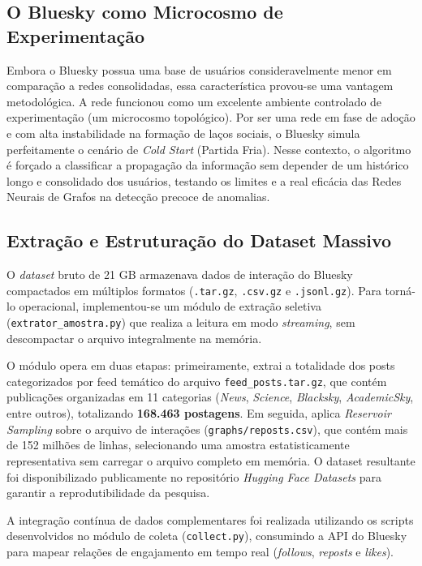\subsection{O Bluesky como Microcosmo de Experimentação}

Embora o Bluesky possua uma base de usuários consideravelmente menor em comparação a redes consolidadas, essa característica provou-se uma vantagem metodológica. A rede funcionou como um excelente ambiente controlado de experimentação (um microcosmo topológico). Por ser uma rede em fase de adoção e com alta instabilidade na formação de laços sociais, o Bluesky simula perfeitamente o cenário de \textit{Cold Start} (Partida Fria). Nesse contexto, o algoritmo é forçado a classificar a propagação da informação sem depender de um histórico longo e consolidado dos usuários, testando os limites e a real eficácia das Redes Neurais de Grafos na detecção precoce de anomalias.

\subsection{Extração e Estruturação do Dataset Massivo}

O \textit{dataset} bruto de 21 GB armazenava dados de interação do Bluesky compactados em múltiplos formatos (\texttt{.tar.gz}, \texttt{.csv.gz} e \texttt{.jsonl.gz}). Para torná-lo operacional, implementou-se um módulo de extração seletiva (\texttt{extrator\_amostra.py}) que realiza a leitura em modo \textit{streaming}, sem descompactar o arquivo integralmente na memória.

O módulo opera em duas etapas: primeiramente, extrai a totalidade dos posts categorizados por feed temático do arquivo \texttt{feed\_posts.tar.gz}, que contém publicações organizadas em 11 categorias (\textit{News}, \textit{Science}, \textit{Blacksky}, \textit{AcademicSky}, entre outros), totalizando \textbf{168.463 postagens}. Em seguida, aplica \textit{Reservoir Sampling} sobre o arquivo de interações (\texttt{graphs/reposts.csv}), que contém mais de 152 milhões de linhas, selecionando uma amostra estatisticamente representativa sem carregar o arquivo completo em memória. O dataset resultante foi disponibilizado publicamente no repositório \textit{Hugging Face Datasets} para garantir a reprodutibilidade da pesquisa.

A integração contínua de dados complementares foi realizada utilizando os scripts desenvolvidos no módulo de coleta (\texttt{collect.py}), consumindo a API do Bluesky para mapear relações de engajamento em tempo real (\textit{follows}, \textit{reposts} e \textit{likes}).

